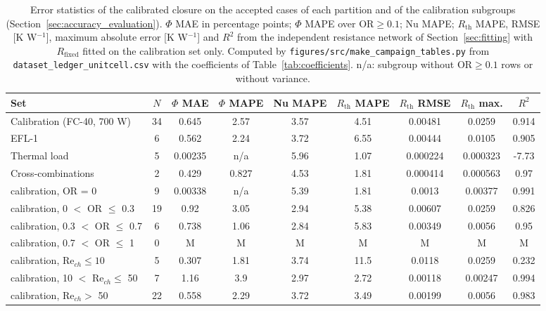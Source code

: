 \begin{table}[htbp]
\centering
\caption{Error statistics of the calibrated closure on the accepted cases of each partition and of the calibration subgroups (Section~\ref{sec:accuracy_evaluation}). $\Phi$ MAE in percentage points; $\Phi$ MAPE over $\mathrm{OR} \ge 0.1$; Nu MAPE; $R_{\mathrm{th}}$ MAPE, RMSE [K W$^{-1}$], maximum absolute error [K W$^{-1}$] and $R^2$ from the independent resistance network of Section~\ref{sec:fitting} with $R_{\mathrm{fixed}}$ fitted on the calibration set only. Computed by \texttt{figures/src/make\_campaign\_tables.py} from \texttt{dataset\_ledger\_unitcell.csv} with the coefficients of Table~\ref{tab:coefficients}. n/a: subgroup without $\mathrm{OR} \ge 0.1$ rows or without variance.}
\label{tab:statistics}
\scriptsize
\setlength{\tabcolsep}{2.5pt}
\begin{tabular}{@{}lcccccccc@{}}
\hline
Set & $N$ & $\Phi$ MAE & $\Phi$ MAPE & Nu MAPE & $R_{\mathrm{th}}$ MAPE & $R_{\mathrm{th}}$ RMSE & $R_{\mathrm{th}}$ max. & $R^2$ \\
\hline
Calibration (FC-40, 700 W) & 34 & 0.645 & 2.57 & 3.57 & 4.51 & 0.00481 & 0.0259 & 0.914 \\
EFL-1 & 6 & 0.562 & 2.24 & 3.72 & 6.55 & 0.00444 & 0.0105 & 0.905 \\
Thermal load & 5 & 0.00235 & n/a & 5.96 & 1.07 & 0.000224 & 0.000323 & -7.73 \\
Cross-combinations & 2 & 0.429 & 0.827 & 4.53 & 1.81 & 0.000414 & 0.000563 & 0.97 \\
\hline
calibration, OR = 0 & 9 & 0.00338 & n/a & 5.39 & 1.81 & 0.0013 & 0.00377 & 0.991 \\
calibration, 0 $<$ OR $\le$ 0.3 & 19 & 0.92 & 3.05 & 2.94 & 5.38 & 0.00607 & 0.0259 & 0.826 \\
calibration, 0.3 $<$ OR $\le$ 0.7 & 6 & 0.738 & 1.06 & 2.84 & 5.83 & 0.00349 & 0.0056 & 0.95 \\
calibration, 0.7 $<$ OR $\le$ 1 & 0 & M & M & M & M & M & M & M \\
calibration, $\mathrm{Re}_{ch} \le 10$ & 5 & 0.307 & 1.81 & 3.74 & 11.5 & 0.0118 & 0.0259 & 0.232 \\
calibration, 10 $<$ $\mathrm{Re}_{ch} \le$ 50 & 7 & 1.16 & 3.9 & 2.97 & 2.72 & 0.00118 & 0.00247 & 0.994 \\
calibration, $\mathrm{Re}_{ch} >$ 50 & 22 & 0.558 & 2.29 & 3.72 & 3.49 & 0.00199 & 0.0056 & 0.983 \\
\hline
\end{tabular}
\end{table}
